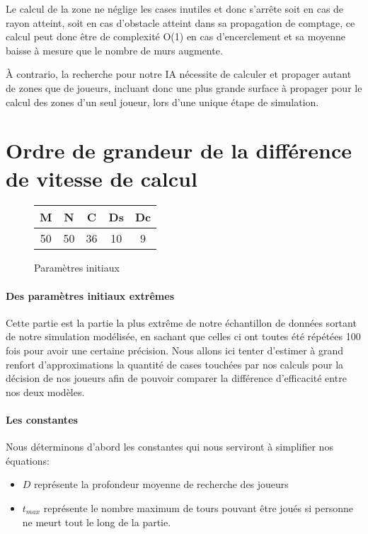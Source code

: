 		Le calcul de la zone ne néglige les cases inutiles et donc s'arrête soit en cas de rayon atteint, soit en cas d'obstacle atteint dans sa propagation de comptage, ce calcul peut donc être de complexité O(1) en cas d'encerclement et sa moyenne baisse à mesure que le nombre de murs augmente.
		
		À contrario, la recherche pour notre IA nécessite de calculer et propager autant de zones que de joueurs, incluant donc une plus grande surface à propager pour le calcul des zones d'un seul joueur, lors d'une unique étape de simulation.
	
	\section{Ordre de grandeur de la différence de vitesse de calcul}
		\begin{figure}[H]
			\centering
			\begin{tabular}{c c c c c}
				M&N&C&Ds&Dc\\\hline
				50&50&36&10&9\\				
			\end{tabular}
		\caption{Paramètres initiaux}	
		\end{figure}
		
		\paragraph{Des paramètres initiaux extrêmes}
		Cette partie est la partie la plus extrême de notre échantillon de données sortant de notre simulation modélisée, en sachant que celles ci ont toutes été répétées 100 fois pour avoir une certaine précision.
		Nous allons ici tenter d'estimer à grand renfort d'approximations la quantité de cases touchées par nos calculs pour la décision de nos joueurs afin de pouvoir comparer la différence d'efficacité entre nos deux modèles. 
		
		\paragraph{Les constantes}
		Nous déterminons d'abord les constantes qui nous serviront à simplifier nos équations:
		\begin{itemize}
			\item $D$ représente la profondeur moyenne de recherche des joueurs
			\item $t_{max}$ représente le nombre maximum de tours pouvant être joués si personne ne meurt tout le long de la partie.
		\end{itemize}
	
